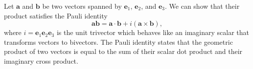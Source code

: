 \documentclass[twocolumn,showpacs,preprintnumbers,amsmath,amssymb]{revtex4}
\begin{document}
Let $\mathbf a$ and $\mathbf b$ be two vectors spanned by $\mathbf e_1$, $\mathbf e_2$, and $\mathbf e_3$.  We can show that their product satisfies the Pauli identity\cite{baylis1,lounesto}
\begin{equation}
\mathbf a\mathbf b = \mathbf a\cdot\mathbf b + i(\mathbf a\times\mathbf b),
\end{equation}
where 
$i=\mathbf e_1\mathbf e_2\mathbf e_3$
is the unit trivector which behaves like an imaginary scalar that transforms vectors to bivectors. 
The Pauli identity states that the geometric product of two vectors is equal to the sum of their scalar dot product and their imaginary cross product.

%
\end{document}
